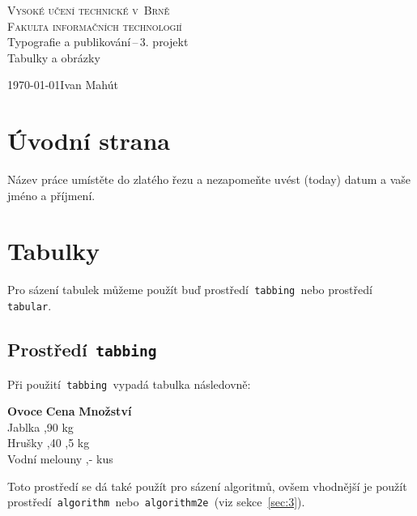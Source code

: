 \documentclass[a4paper, 11pt]{article}
\begin{document}

\begin{titlepage}
    \begin{center}
        \Huge\textsc{Vysoké učení technické v~Brně}\\
        \huge\textsc{Fakulta informačních technologií}\\
        \LARGE Typografie a publikování\,--\,3. projekt\\ 
        \Huge Tabulky a obrázky\\
    \end{center}
    {\Large \today \hfill Ivan Mahút}
\end{titlepage}

\pagebreak
\setcounter{page}{1}

\section{Úvodní strana} \label{sec:1}
Název práce umístěte do zlatého řezu a nezapomeňte uvést  (today) datum a vaše jméno a příjmení.

\section{Tabulky} \label{sec:2}
Pro sázení tabulek můžeme použít buď prostředí\texttt{ tabbing }nebo prostředí\texttt{ tabular}.

\subsection{Prostředí\texttt{ tabbing}}
Při použití\texttt{ tabbing }vypadá tabulka následovně:
\begin{tabbing}

\textbf{Ovoce} \qquad\qquad  \= \textbf{Cena}	\quad \=\textbf{Množství} \\
Jablka		,90			 kg \\
Hrušky		,40			,5 kg \\
Vodní melouny	,-			 kus \\
\end{tabbing}

\noindent Toto prostředí se dá také použít pro sázení algoritmů, ovšem vhodnější je použít prostředí\texttt{ algorithm }nebo\texttt{ algorithm2e }(viz sekce~\ref{sec:3}).
\end{document}

